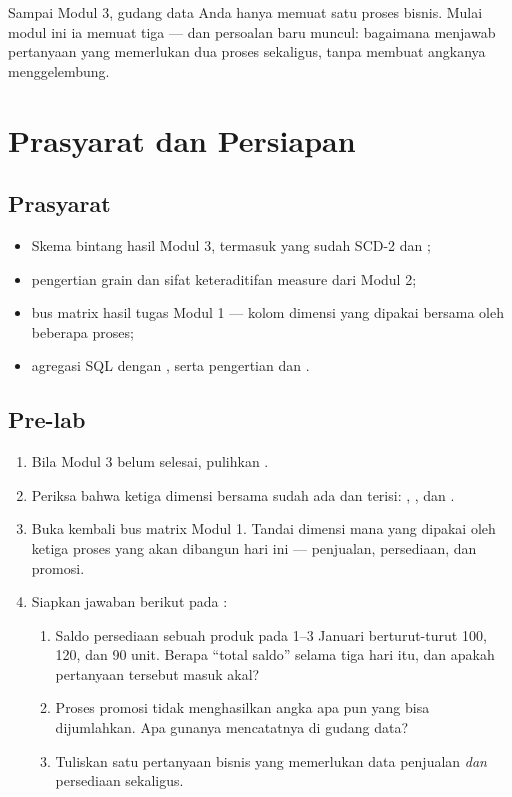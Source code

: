Sampai Modul 3, gudang data Anda hanya memuat satu proses bisnis. Mulai modul
ini ia memuat tiga --- dan persoalan baru muncul: bagaimana menjawab pertanyaan
yang memerlukan dua proses sekaligus, tanpa membuat angkanya menggelembung.

\section{Prasyarat dan Persiapan}

\subsection{Prasyarat}

\begin{itemize}
  \item Skema bintang hasil Modul 3, termasuk  yang sudah
        SCD-2 dan ;
  \item pengertian grain dan sifat keteraditifan measure dari Modul 2;
  \item bus matrix hasil tugas Modul 1 --- kolom dimensi yang dipakai bersama
        oleh beberapa proses;
  \item agregasi SQL dengan , serta pengertian
         dan .
\end{itemize}

\subsection{Pre-lab}

\begin{enumerate}[leftmargin=1.4em]
  \item Bila Modul 3 belum selesai, pulihkan .
  \item Periksa bahwa ketiga dimensi bersama sudah ada dan terisi:
        , , dan
        .
  \item Buka kembali bus matrix Modul 1. Tandai dimensi mana yang dipakai oleh
        ketiga proses yang akan dibangun hari ini --- penjualan, persediaan, dan
        promosi.
  \item Siapkan jawaban berikut pada :
  \begin{enumerate}[label=\alph*.,leftmargin=1.4em]
    \item Saldo persediaan sebuah produk pada 1--3 Januari berturut-turut 100,
          120, dan 90 unit. Berapa ``total saldo'' selama tiga hari itu, dan
          apakah pertanyaan tersebut masuk akal?
    \item Proses promosi tidak menghasilkan angka apa pun yang bisa
          dijumlahkan. Apa gunanya mencatatnya di gudang data?
    \item Tuliskan satu pertanyaan bisnis yang memerlukan data penjualan
          \emph{dan} persediaan sekaligus.
  \end{enumerate}
\end{enumerate}

